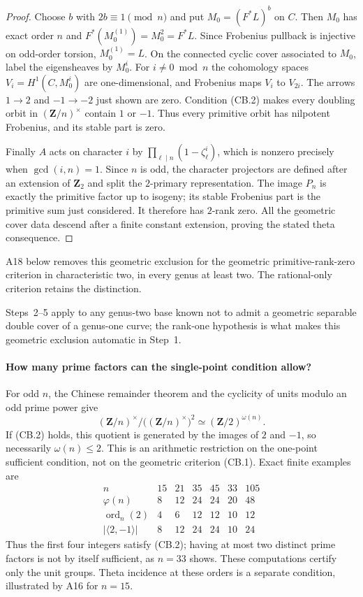 \documentclass[11pt,a4paper]{article}
\begin{document}
\begin{proof}
Choose $b$ with $2b\equiv1\pmod n$ and put $M_0=(F^*L)^b$ on $C$.
Then $M_0$ has exact order $n$ and
$F^*(M_0^{(1)})=M_0^2=F^*L$. Since Frobenius pullback is
injective on odd-order torsion, $M_0^{(1)}=L$. On the connected
cyclic cover associated to $M_0$, label the eigensheaves by $M_0^i$.
For $i\ne0\bmod n$ the cohomology spaces
$V_i=H^1(C,M_0^i)$ are one-dimensional, and Frobenius maps
$V_i$ to $V_{2i}$. The arrows $1\to2$ and $-1\to-2$ just shown
are zero. Condition (CB.2) makes every doubling orbit in
$(\mathbf Z/n)^\times$ contain $1$ or $-1$. Thus every primitive
orbit has nilpotent Frobenius, and its stable part is zero.

Finally $A$ acts on character $i$ by
$\prod_{\ell\mid n}(1-\zeta_\ell^i)$, which is nonzero precisely
when $\gcd(i,n)=1$. Since $n$ is odd, the character projectors are
defined after an extension of $\mathbf Z_2$ and split the
$2$-primary representation. The image $P_n$ is exactly the
primitive factor up to isogeny; its stable Frobenius part is the
primitive sum just considered. It therefore has $2$-rank zero.
All the geometric cover data descend after a finite constant
extension, proving the stated theta consequence.
\end{proof}

A18 below removes this geometric exclusion for the geometric
primitive-rank-zero criterion in characteristic two, in every genus
at least two. The rational-only criterion retains the distinction.

Steps~2--5 apply to any genus-two base known not to admit a geometric
separable double cover of a genus-one curve; the rank-one hypothesis
is what makes this geometric exclusion automatic in Step~1.

\paragraph{How many prime factors can the single-point condition allow?}
For odd $n$, the Chinese remainder theorem and the cyclicity of units
modulo an odd prime power give
\[
 (\mathbf Z/n)^\times/\bigl((\mathbf Z/n)^\times\bigr)^2
                  \simeq (\mathbf Z/2)^{\omega(n)}.
\]
If (CB.2) holds, this quotient is generated by the images of $2$ and
$-1$, so necessarily $\omega(n)\le2$. This is an arithmetic
restriction on the one-point sufficient condition, not on the
geometric criterion (CB.1). Exact finite examples are
\[
\begin{array}{c|rrrrrr}
 n&15&21&35&45&33&105\\ \hline
 \varphi(n)&8&12&24&24&20&48\\
 \operatorname{ord}_n(2)&4&6&12&12&10&12\\
 |\langle2,-1\rangle|&8&12&24&24&10&24
\end{array}
\]
Thus the first four integers satisfy (CB.2); having at most two
distinct prime factors is not by itself sufficient, as $n=33$ shows.
These computations certify only the unit groups. Theta incidence at
these orders is a separate condition, illustrated by A16 for $n=15$.
\end{document}
